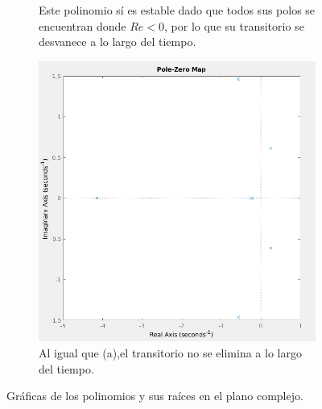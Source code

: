 \documentclass[12pt, letterpaper]{article}
\begin{document}
\begin{enumerate}
\begin{figure}[H]
\begin{subfigure}[b]{0.49\linewidth}
						\caption{Este polinomio sí es estable dado que todos sus polos se encuentran donde $Re < 0$, por lo que su transitorio se desvanece a lo largo del tiempo.}
					\end{subfigure}
					\begin{subfigure}[b]{0.49\linewidth}
						\includegraphics[width=\linewidth]{3c.png}
						\caption{Al igual que (a),el transitorio no se elimina a lo largo del tiempo.}
					\end{subfigure}
					\caption{Gráficas de los polinomios y sus raíces en el plano complejo.}
				\end{figure}
			

\end{enumerate}
\end{document}
